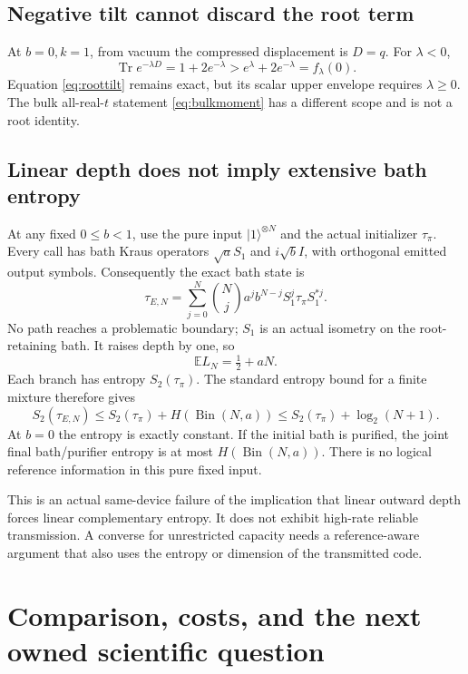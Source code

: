 \documentclass[11pt]{article}
\newcommand{\Tr}{\operatorname{Tr}}
\newcommand{\ket}[1]{\lvert #1\rangle}
\newcommand{\E}{\mathbb E}
\begin{document}
\subsection{Negative tilt cannot discard the root term}

At \(b=0,k=1\), from vacuum the compressed displacement is \(D=q\).
For \(\lambda<0\),
\[
 \Tr e^{-\lambda D}=1+2e^{-\lambda}
 >e^\lambda+2e^{-\lambda}=f_\lambda(0).
\]
Equation \eqref{eq:roottilt} remains exact, but its scalar upper envelope
requires \(\lambda\ge0\). The bulk all-real-\(t\) statement
\eqref{eq:bulkmoment} has a different scope and is not a root identity.

\subsection{Linear depth does not imply extensive bath entropy}
\label{sec:purepush}

At any fixed \(0\le b<1\), use the pure input \(\ket1^{\otimes N}\)
and the actual initializer \(\tau_\pi\). Every call has bath Kraus
operators \(\sqrt a S_1\) and \(i\sqrt b I\), with orthogonal emitted
output symbols. Consequently the exact bath state is
\begin{equation}\label{eq:purepush}
 \tau_{E,N}=\sum_{j=0}^N\binom Nj a^j b^{N-j}
                   S_1^j\tau_\pi S_1^{*j}.
\end{equation}
No path reaches a problematic boundary; \(S_1\) is an actual isometry
on the root-retaining bath. It raises depth by one, so
\[
 \E L_N=\tfrac12+aN.
\]
Each branch has entropy \(S_2(\tau_\pi)\). The standard entropy bound
for a finite mixture therefore gives
\[
 S_2(\tau_{E,N})
 \le S_2(\tau_\pi)+H(\operatorname{Bin}(N,a))
 \le S_2(\tau_\pi)+\log_2(N+1).
\]
At \(b=0\) the entropy is exactly constant. If the initial bath is
purified, the joint final bath/purifier entropy is at most
\(H(\operatorname{Bin}(N,a))\).
There is no logical reference information in this pure fixed input.

This is an actual same-device failure of the implication that
linear outward depth forces linear complementary entropy.
It does not exhibit high-rate reliable transmission. A converse for
unrestricted capacity needs a reference-aware argument that also uses
the entropy or dimension of the transmitted code.

\section{Comparison, costs, and the next owned scientific question}
\end{document}
